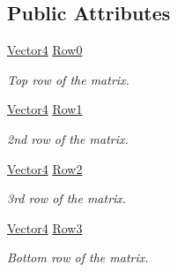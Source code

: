 \subsection*{Public Attributes}
\begin{DoxyCompactItemize}
\item 
\hyperlink{struct_open_t_k_1_1_vector4}{Vector4} \hyperlink{struct_open_t_k_1_1_matrix4_a3fd8b28b615b179bcc0e4fde42113b1d}{Row0}
\begin{DoxyCompactList}\small\item\em Top row of the matrix. \end{DoxyCompactList}\item 
\hyperlink{struct_open_t_k_1_1_vector4}{Vector4} \hyperlink{struct_open_t_k_1_1_matrix4_a41a0aa349da51a65d6cf730c8045752e}{Row1}
\begin{DoxyCompactList}\small\item\em 2nd row of the matrix. \end{DoxyCompactList}\item 
\hyperlink{struct_open_t_k_1_1_vector4}{Vector4} \hyperlink{struct_open_t_k_1_1_matrix4_a8efc78c75943f100dc9381de44c451d9}{Row2}
\begin{DoxyCompactList}\small\item\em 3rd row of the matrix. \end{DoxyCompactList}\item 
\hyperlink{struct_open_t_k_1_1_vector4}{Vector4} \hyperlink{struct_open_t_k_1_1_matrix4_a4fac10569a36cd69f508ba6b4ea15cb5}{Row3}
\begin{DoxyCompactList}\small\item\em Bottom row of the matrix. \end{DoxyCompactList}\end{DoxyCompactItemize}
